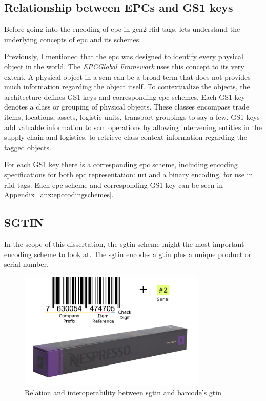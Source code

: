 \subsection{Relationship between EPCs and GS1 keys}

Before going into the encoding of \ac{epc} in \ac{gen2} \ac{rfid} tags, lets understand the underlying concepts of \ac{epc} and its schemes.

Previously, I mentioned that the \ac{epc} was designed to identify every physical object in the world.
The \emph{EPCGlobal Framework} uses this concept to its very extent.
A physical object in a \ac{scm} can be a broad term that does not provides much information regarding the object itself.
To contextualize the objects, the architecture defines GS1 keys and corresponding \ac{epc} schemes.
Each GS1 key denotes a class or grouping of physical objects. These classes encompass trade items, locations, assets, logistic units, transport groupings to say a few.
GS1 keys add valuable information to \ac{scm} operations by allowing intervening entities in the supply chain and logistics, to retrieve class context information regarding the tagged objects.

For each GS1 key there is a corresponding \ac{epc} scheme, including encoding specifications for both \ac{epc} representation: \ac{uri} and a binary encoding, for use in \ac{rfid} tags.
Each \ac{epc} scheme and corresponding GS1 key can be seen in Appendix~\ref{anx:epccodingschemes}.

\subsection{SGTIN}

In the scope of this dissertation, the \ac{sgtin} scheme might the most important encoding scheme to look at.
The \ac{sgtin} encodes a \ac{gtin} plus a unique product or serial number.

\begin{figure}[!ht]
    \centering
    \includegraphics[width=0.8\textwidth]{./figs/02-state-of-the-art/SGTIN_UPC_Compare.pdf}
    \caption[Relation and interoperability between \ac{sgtin} and barcode's \ac{gtin}]{Relation and interoperability between \ac{sgtin} and barcode's \ac{gtin}} 
    \label{fig:barcodesgtin}
\end{figure}

